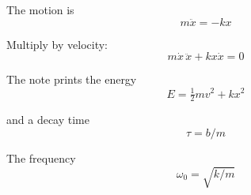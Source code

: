 \documentclass{article}
\begin{document}
The motion is
\begin{equation}
m\ddot{x}=-kx
\end{equation}

Multiply by velocity:
\begin{equation}
m\dot{x}\,\ddot{x}+kx\dot{x}=0
\end{equation}

The note prints the energy
\begin{equation}
E=\tfrac{1}{2}mv^{2}+kx^{2}
\end{equation}

and a decay time
\begin{equation}
\tau=b/m
\end{equation}

The frequency
\begin{equation}
\omega_{0}=\sqrt{k/m}
\end{equation}
\end{document}
